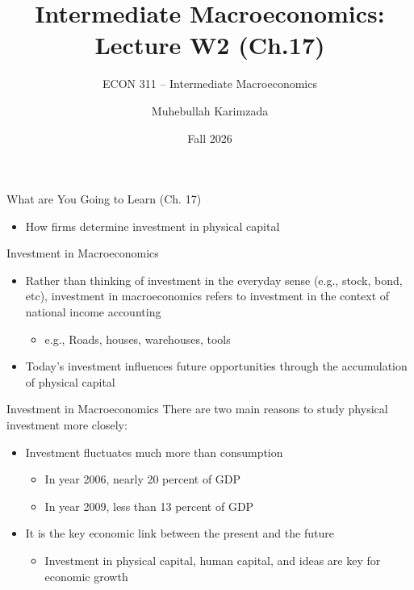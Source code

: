\documentclass[aspectratio=1610]{beamer}
\title[Winter - Lecture 2] %
{Intermediate Macroeconomics: Lecture  W2 (Ch.17)}
\subtitle{ECON 311 -- Intermediate Macroeconomics}
\author{Muhebullah Karimzada}
\institute{School of Economics \\\ University of Northern British Columbia}
\date{Fall 2026}
\begin{document}
\begin{frame}[plain]
  \titlepage
\end{frame}

\begin{frame}[wide]{What are You Going to Learn (Ch. 17)}
	\begin{itemize}
		\item How firms determine investment in physical capital
	\end{itemize}
\end{frame}

\begin{frame}[wide]{Investment in Macroeconomics}
	\begin{itemize}
		\item Rather than thinking of investment in the everyday sense (e.g., stock, bond, etc), investment in macroeconomics refers to investment in the context of national income accounting
		\vspace{1mm}
		\begin{itemize}
			\item e.g., Roads, houses, warehouses, tools
		\end{itemize}
		\vspace{3mm}
		\item Today’s investment influences future opportunities through the accumulation of physical capital
	\end{itemize}
\end{frame}

\begin{frame}[wide]{Investment in Macroeconomics}
	There are two main reasons to study physical investment more closely:
	\vspace{2mm}
	\begin{itemize}
		\item Investment fluctuates much more than consumption
		\begin{itemize}
			\item In year 2006, nearly 20 percent of GDP
			\item In year 2009, less than 13 percent of GDP
		\end{itemize}
		\item It is the key economic link between the present and the future
		\begin{itemize}
			\item Investment in physical capital, human capital, and ideas are key for economic growth
		\end{itemize}
	\end{itemize}
\end{frame}
\end{document}

